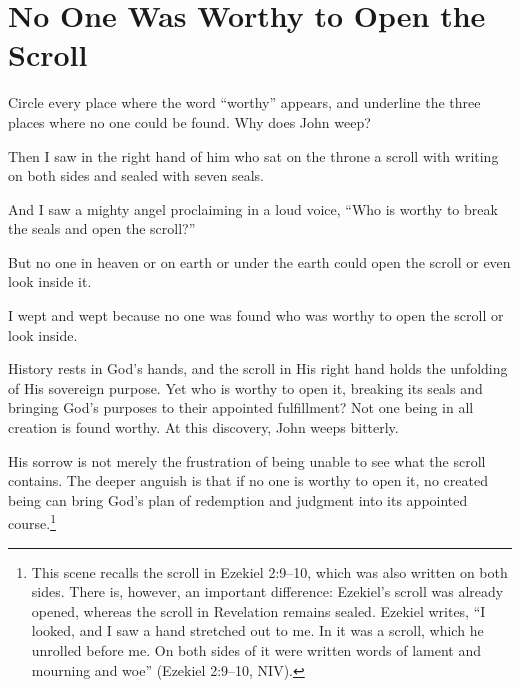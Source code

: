 \section{No One Was Worthy to Open the Scroll}


\begin{ScriptureBox2}{Circle every place where the word ``worthy'' appears, and underline the three places where no one could be found. Why does John weep?}

\item[5:1] Then I saw in the right hand of him who sat on the throne a scroll with writing on both sides and sealed with seven seals.

\item[5:2] And I saw a mighty angel proclaiming in a loud voice, ``Who is worthy to break the seals and open the scroll?''

\item[5:3] But no one in heaven or on earth or under the earth could open the scroll or even look inside it.

\item[5:4] I wept and wept because no one was found who was worthy to open the scroll or look inside.

\end{ScriptureBox2}




History rests in God's hands, and the scroll in His right hand holds the unfolding of His sovereign purpose. Yet who is worthy to open it, breaking its seals and bringing God's purposes to their appointed fulfillment? Not one being in all creation is found worthy. At this discovery, John weeps bitterly.

His sorrow is not merely the frustration of being unable to see what the scroll contains. The deeper anguish is that if no one is worthy to open it, no created being can bring God's plan of redemption and judgment into its appointed course.\footnote{This scene recalls the scroll in Ezekiel 2:9--10, which was also written on both sides. There is, however, an important difference: Ezekiel's scroll was already opened, whereas the scroll in Revelation remains sealed. Ezekiel writes, ``I looked, and I saw a hand stretched out to me. In it was a scroll, which he unrolled before me. On both sides of it were written words of lament and mourning and woe'' (Ezekiel 2:9--10, NIV).}

